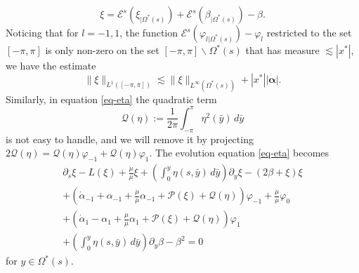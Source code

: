 \documentclass[12pt]{amsart}
\numberwithin{equation}{section}
\numberwithin{equation}{section}
\begin{document}
$$
\xi =\mathcal E^s (\xi_{|\Omega^*(s)})+ \mathcal E^s (\beta_{|\Omega^*(s)})-\beta.
$$
Noticing that for $l=-1,1$, the function $\mathcal E^s (\varphi_{l|\Omega^*(s)})-\varphi_{l}$ restricted to the set $[-\pi,\pi]$ is only non-zero on the set $[-\pi,\pi]\backslash \Omega^*(s)$ that has measure $\lesssim |x^*|$, we have the estimate
\begin{equation} \label{bd:xi-L1--pi-pi}
\| \xi \|_{L^1([-\pi,\pi])} \lesssim \| \xi\|_{L^\infty(\Omega^*(s))}+|x^*||\boldsymbol{\alpha}|.
\end{equation}
Similarly, in equation  \eqref{eq-eta} the quadratic term
$$
\mathcal Q (\eta):=\frac{1}{2\pi} \int_{-\pi}^{\pi}\eta^2(\bar y)\,d\bar y
$$
is not easy to handle, and we will remove it by projecting $2\mathcal Q (\eta)= \mathcal{Q}(\eta) \varphi_{-1}+ \mathcal{Q}(\eta) \varphi_1$. The evolution equation \eqref{eq-eta} becomes
\begin{multline}\label{eq-eta-inter}
  \partial_s \xi - L( \xi) +\frac{\dot\mu }{\mu} \xi + \left(\int_{0}^y \eta(s,  \bar y) \,d\bar y\right) \partial_y \xi -\left(2\beta+\xi \right)\xi\\
 +\left(\dot\alpha_{-1}+\alpha_{-1}+\frac{\dot\mu}{\mu}\alpha_{-1}+\mathcal P(\xi)+\mathcal Q(\eta)\right)\varphi_{-1}+\frac{\dot\mu}{\mu} \varphi_0\\
 +\left(\dot\alpha_{1}-\alpha_{1}+\frac{\dot\mu}{\mu}\alpha_{1}+\mathcal P (\xi)+\mathcal Q (\eta)\right)\varphi_{1}\\
 +  \left(\int_0^y \eta(s,  \bar y)\,d\bar y\right)\partial_y \beta-\beta^2=0
\end{multline}
for $y\in \Omega^*(s)$.
\end{document}
